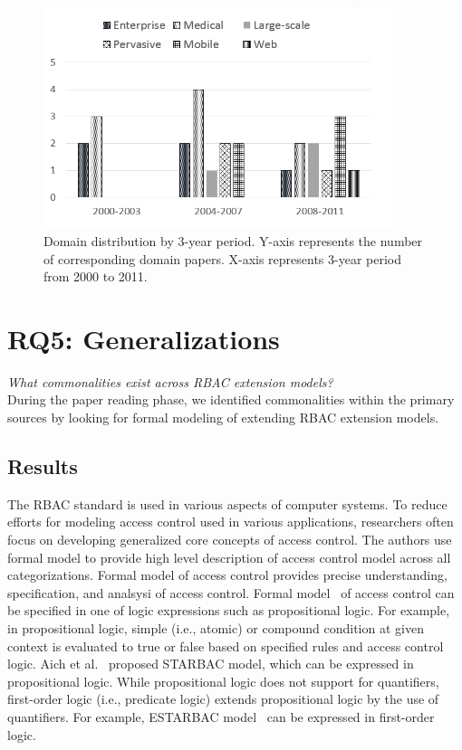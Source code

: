 
\begin{figure}[ht]
    \centering
        \includegraphics[width=4.0in]{sections/dist_domains_byYear.png}
\vspace{-0.2 in}
    \caption{\label{fig:dist_domains}Domain distribution by 3-year period. Y-axis represents the number of corresponding domain papers.
    X-axis represents 3-year period from 2000 to 2011.}
\end{figure}

\section{RQ5: Generalizations} \label{sec:generalizations}

\textit{What commonalities exist across RBAC extension models?}
\\

During the paper reading phase, we identified commonalities within the primary sources
by looking for formal modeling of extending RBAC extension models.

\subsection{Results}

The RBAC standard is used in various aspects of computer systems. To reduce efforts for modeling access control used in various applications, researchers often focus on developing generalized core concepts of access control.
The authors use formal model to provide high level description of access control model across all categorizations.
Formal model of access control provides precise understanding, specification, and analsysi of access control.
Formal model~\cite{abadi2008variations} of access control can be specified in one of logic expressions such as propositional logic. For example, in propositional logic, simple (i.e., atomic) or compound condition at given context is evaluated to true or false based on specified rules and access control logic. Aich et al.~\cite{aich09:role} proposed STARBAC model,  which can be expressed in propositional logic. While propositional logic does not support for quantifiers, first-order logic (i.e., predicate logic) extends propositional logic by the use of quantifiers. For example, ESTARBAC model~\cite{aich09:role} can be expressed in first-order logic.


